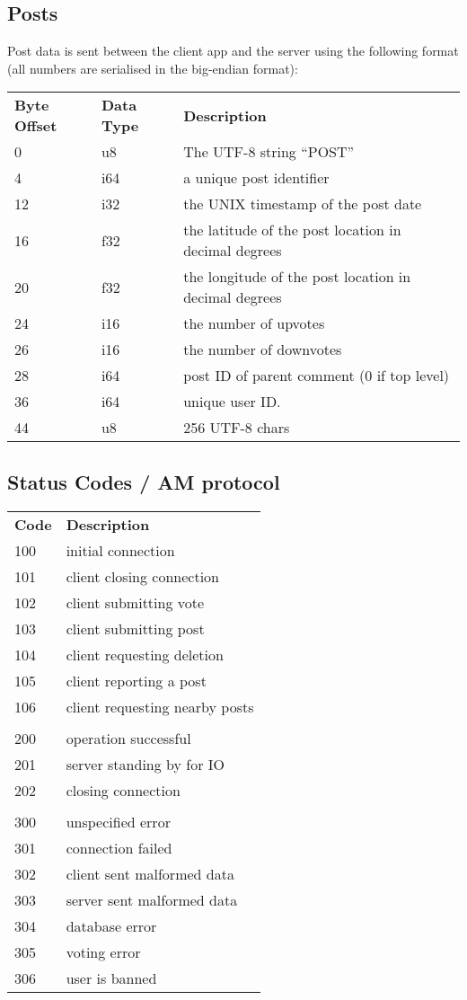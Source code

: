 \documentclass[12pt, a4paper]{article}
\begin{document}
\subsection{Posts}
Post data is sent between the client app and the server using the following format (all numbers are serialised in the big-endian format):
\begin{table}[h]
\centering
\begin{tabular}{lll}
\textbf{Byte Offset} & \textbf{Data Type} &\textbf{Description}\\
0 & u8 & The UTF-8 string ``POST''\\
4 & i64 & a unique post identifier\\
12 & i32 & the UNIX timestamp of the post date\\
16 & f32 & the latitude of the post location in decimal degrees\\
20 & f32 & the longitude of the post location in decimal degrees\\
24 & i16 & the number of upvotes\\
26 & i16 & the number of downvotes\\
28 & i64 & post ID of parent comment (0 if top level)\\
36 & i64 & unique user ID.\\
44 & u8 & 256 UTF-8 chars \\
\end{tabular}
\end{table}
\clearpage

\subsection{Status Codes / AM protocol}
\begin{table}[h]
\centering
\label{my-label}
\begin{tabular}{ll}
\textbf{Code} &\textbf{Description}\\
100 & initial connection\\
101 & client closing connection\\
102 & client submitting vote\\
103 & client submitting post\\
104 & client requesting deletion\\
105 & client reporting a post\\
106 & client requesting nearby posts\\
&\\
200 & operation successful\\
201 & server standing by for IO\\
202 & closing connection\\
&\\
300 & unspecified error\\
301 & connection failed\\
302 & client sent malformed data\\
303 & server sent malformed data\\
304 & database error\\
305 & voting error\\
306 & user is banned\\
\end{tabular}
\end{table}
\end{document}
